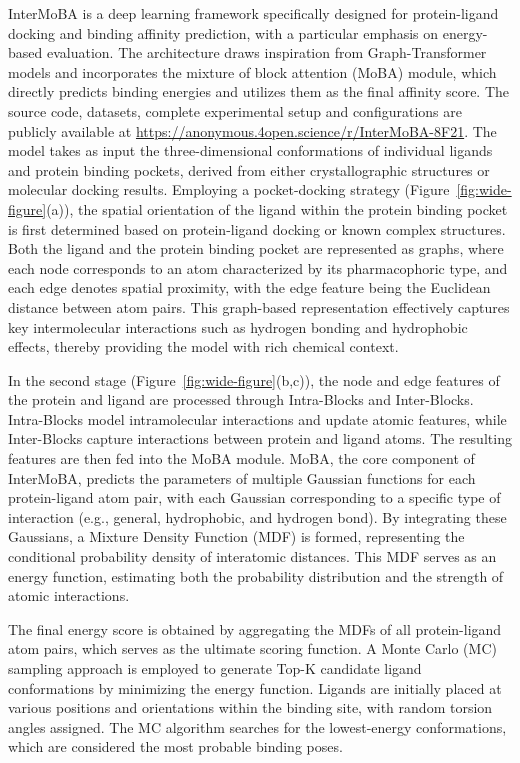 \documentclass[11pt,a4paper]{article}
\begin{document}
InterMoBA is a deep learning framework specifically designed for protein-ligand docking and binding affinity prediction, with a particular emphasis on energy-based evaluation. The architecture draws inspiration from Graph-Transformer\cite{vaswani2017attention} \cite{yun2019graph} models and incorporates the mixture of block attention (MoBA)\cite{bishop1994mixture} module, which directly predicts binding energies and utilizes them as the final affinity score. The source code, datasets, complete experimental setup and configurations are publicly available at \href{https://anonymous.4open.science/r/InterMoBA-8F21}{https://anonymous.4open.science/r/InterMoBA-8F21}.
The model takes as input the three-dimensional conformations of individual ligands and protein binding pockets, derived from either crystallographic structures or molecular docking results. Employing a pocket-docking strategy (Figure~\ref{fig:wide-figure}(a)), the spatial orientation of the ligand within the protein binding pocket is first determined based on protein-ligand docking or known complex structures. Both the ligand and the protein binding pocket are represented as graphs\cite{stark2022equibind}, where each node corresponds to an atom characterized by its pharmacophoric type, and each edge denotes spatial proximity, with the edge feature being the Euclidean distance between atom pairs. This graph-based\cite{scarselli2008graph} representation effectively captures key intermolecular interactions such as hydrogen bonding and hydrophobic effects, thereby providing the model with rich chemical context.

In the second stage (Figure~\ref{fig:wide-figure}(b,c)), the node and edge features of the protein and ligand are processed through Intra-Blocks and Inter-Blocks. Intra-Blocks model intramolecular interactions and update atomic features, while Inter-Blocks capture interactions between protein and ligand atoms. The resulting features are then fed into the MoBA module.
MoBA, the core component of InterMoBA, predicts the parameters of multiple Gaussian functions for each protein-ligand atom pair, with each Gaussian corresponding to a specific type of interaction (e.g., general, hydrophobic, and hydrogen bond). By integrating these Gaussians, a Mixture Density Function (MDF) is formed, representing the conditional probability density of interatomic distances. This MDF serves as an energy function, estimating both the probability distribution and the strength of atomic interactions.

The final energy score is obtained by aggregating the MDFs of all protein-ligand atom pairs, which serves as the ultimate scoring function. A Monte Carlo (MC)\cite{metropolis1953equation} sampling approach is employed to generate Top-K candidate ligand conformations by minimizing the energy function. Ligands are initially placed at various positions and orientations within the binding site, with random torsion angles assigned. The MC algorithm searches for the lowest-energy conformations, which are considered the most probable binding poses.
\end{document}
